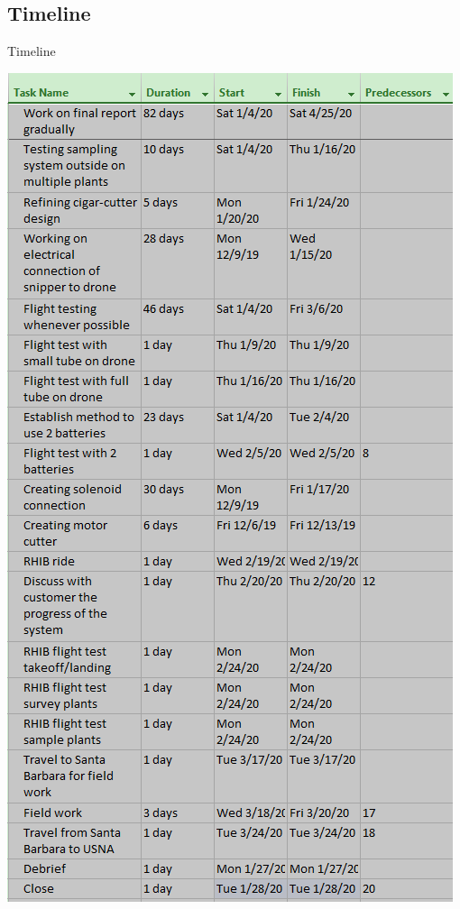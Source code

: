 \documentclass{wrcecapstone}
\begin{document}
\subsection{Timeline}
\begin{table}
\caption{Timeline}
\label{tab:8.2.2}
\begin{center}
\includegraphics[width=0.8\columnwidth]{figures/table-821.png}
\end{center}
\end{table}
\end{document}
